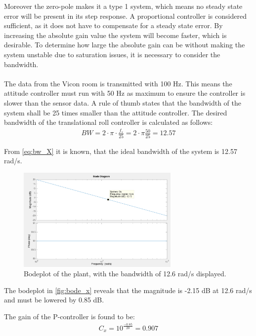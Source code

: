 Moreover the zero-pole makes it a type 1 system, which means no steady state error will be present in its step response. 
A proportional controller is considered sufficient, as it does not have to compensate for a steady state error. By increasing the absolute gain value the system will become faster, which is desirable. To determine how large the absolute gain can be without making the system unstable due to saturation issues, it is necessary to consider the bandwidth. \\ \\
The data from the Vicon room is transmitted with 100 Hz. This means the attitude controller must run with 50 Hz as maximum to ensure the controller is slower than the sensor data. A rule of thumb states that the bandwidth of the system shall be 25 times smaller than the attitude controller. The desired bandwidth of the translational roll controller is calculated as follows:
\begin{align}
BW=2\cdot \pi\cdot \frac{f_s}{25}=2\cdot \pi \frac{50}{25}=12.57\label{eq:bw_X}
\end{align}
\begin{where}
\end{where}

From \autoref{eq:bw_X} it is known, that the ideal bandwidth of the system is 12.57 rad/s. 
\begin{figure}[H]
	\centering
	\includegraphics[width=0.7\textwidth]{figures/bode_x.png}
	\caption{Bodeplot of the plant, with the bandwidth of 12.6 rad/s displayed.}\label{fig:bode_x}
\end{figure}
The bodeplot in \autoref{fig:bode_x} reveals that the magnitude is -2.15 dB at 12.6 rad/s and must be lowered by 0.85 dB. 

The gain of the P-controller is found to be: 
\begin{align}
C_x=10^{\frac{-0.85}{20}}=0.907
\end{align}

